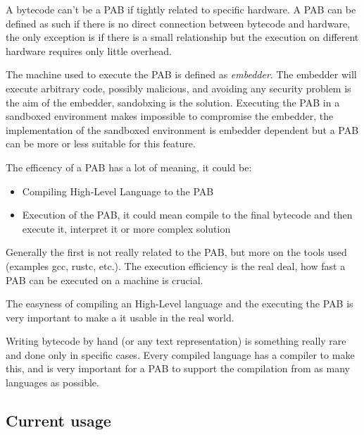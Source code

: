\documentclass[../main.tex]{subfiles}
\begin{document}
\begin{description}[style=nextline]
  \item[Hardware Independence]
        A bytecode can't be a PAB if tightly related to specific hardware. A PAB can be defined as such if there is no direct connection between bytecode and hardware, the only exception is if there is a small relationship but the execution on different hardware requires only little overhead.
  \item[Sandboxing]
        The machine used to execute the PAB is defined as \textit{embedder}. The embedder will execute arbitrary code, possibly malicious, and avoiding any security problem is the aim of the embedder, sandobxing is the solution.
        Executing the PAB in a sandboxed environment makes impossible to compromise the embedder, the implementation of the sandboxed environment is embedder dependent but a PAB can be more or less suitable for this feature.
  \item[Efficency]
        The efficency of a PAB has a lot of meaning, it could be:

        \begin{itemize}
          \item Compiling High-Level Language to the PAB
          \item Execution of the PAB, it could mean compile to the final bytecode and then execute it, interpret it or more complex solution
        \end{itemize}

        Generally the first is not really related to the PAB, but more on the tools used (examples gcc, rustc, etc.). The execution efficiency is the real deal, how fast a PAB can be executed on a machine is crucial.
  \item[Tool Simlicity]
        The easyness of compiling an High-Level language and the executing the PAB is very important to make a it usable in the real world.
  \item[Support as Compilation Target]
        Writing bytecode by hand (or any text representation) is something really rare and done only in specific cases. Every compiled language has a compiler to make this, and is very important for a PAB to support the compilation from as many languages as possible.
\end{description}

\subsection{Current usage}
\end{document}

